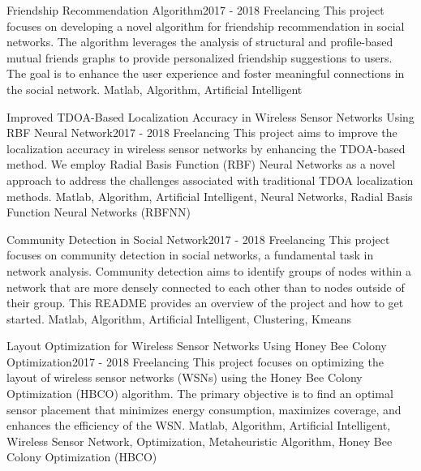 
\begin{projects}
	\project
	{Friendship Recommendation Algorithm}{2017 - 2018}
	{ {Freelancing} }
	{This project focuses on developing a novel algorithm for friendship recommendation in social networks. The algorithm leverages the analysis of structural and profile-based mutual friends graphs to provide personalized friendship suggestions to users. The goal is to enhance the user experience and foster meaningful connections in the social network.}
	{Matlab, Algorithm, Artificial Intelligent}
				
	\project
	{Improved TDOA-Based Localization Accuracy in Wireless Sensor Networks Using RBF Neural Network}{2017 - 2018}
	{ {Freelancing} }
	{This project aims to improve the localization accuracy in wireless sensor networks by enhancing the TDOA-based method. We employ Radial Basis Function (RBF) Neural Networks as a novel approach to address the challenges associated with traditional TDOA localization methods.}
	{Matlab, Algorithm, Artificial Intelligent, Neural Networks, Radial Basis Function Neural Networks (RBFNN)}

	\project
	{Community Detection in Social Network}{2017 - 2018}
	{ {Freelancing} }
	{This project focuses on community detection in social networks, a fundamental task in network analysis. Community detection aims to identify groups of nodes within a network that are more densely connected to each other than to nodes outside of their group. This README provides an overview of the project and how to get started.}
	{Matlab, Algorithm, Artificial Intelligent, Clustering, Kmeans}

	\project
	{Layout Optimization for Wireless Sensor Networks Using Honey Bee Colony Optimization}{2017 - 2018}
	{ {Freelancing} }
	{This project focuses on optimizing the layout of wireless sensor networks (WSNs) using the Honey Bee Colony Optimization (HBCO) algorithm. The primary objective is to find an optimal sensor placement that minimizes energy consumption, maximizes coverage, and enhances the efficiency of the WSN.}
	{Matlab, Algorithm, Artificial Intelligent, Wireless Sensor Network, Optimization, Metaheuristic Algorithm, Honey Bee Colony Optimization (HBCO)}
\end{projects}